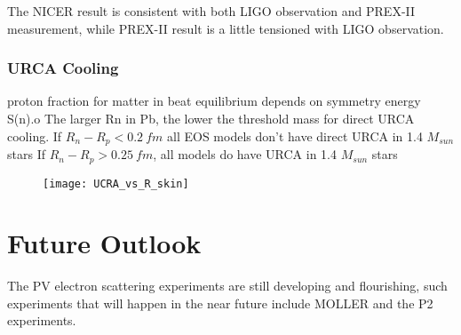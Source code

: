 The NICER result is consistent with both LIGO observation and PREX-II measurement,
while PREX-II result is a little tensioned with LIGO observation.

\begin{comment}
    \item Dipole polarizability of an atom $\sim R^3$
	$$ \kappa = \sum_f \frac{|\bra{f}rY_{10}\ket{i}|^2}{E_f - E_i} \propto R^3 $$
    \item Tidal deformability (quardupole polarizability) of a neutron star scales as $R^5$
	$$ \Lambda = \sum_f \frac{|\bra{f}r^2Y_{20}\ket{i}|^2}{E_f - E_i} \propto R^5 $$
    \item Next generation observer: cosmic explorer (https://arxiv.org/abs/2109.09882)
	can accurately determine deformability of neutron stars
\end{comment}

\subsubsection{URCA Cooling}
proton fraction for matter in beat equilibrium depends on symmetry energy S(n).o
The larger Rn in Pb, the lower the threshold mass for direct URCA cooling.
If $R_n - R_p < 0.2 \ fm$ all EOS models don't have direct URCA in 1.4 $M_{sun}$ stars
If $R_n - R_p > 0.25 \ fm$, all models do have URCA in 1.4 $M_{sun}$ stars
\begin{figure}
    \centering
    \texttt{[image: UCRA\_vs\_R\_skin]}
\end{figure}

\section{Future Outlook}
The PV electron scattering experiments are still developing and flourishing, 
such experiments that will happen in the near future include
MOLLER and the P2 experiments.

